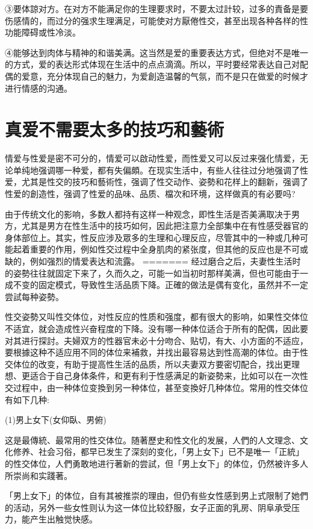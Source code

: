 \documentclass[12pt,UTF8]{ctexbook}
\begin{document}
③要体諒对方。在对方不能满足你的生理要求时，不要太过計较，过多的責备是要伤感情的，而过分的强求生理满足，可能使对方厭倦性交，甚至出现各种各样的性功能障碍或性冷淡。

④能够达到肉体与精神的和谐美满。这当然是爱的重要表达方式，但绝对不是唯一的方式，爱的表达形式体现在生活中的点点滴滴。所以，平时要经常表达自己对配偶的爱意，充分体现自己的魅力，为爱創造温馨的气氛，而不是只在做爱的时候才进行情感的沟通。

\section{真爱不需要太多的技巧和藝術}

情爱与性爱是密不可分的，情爱可以啟动性爱，而性爱又可以反过来强化情爱，无论单纯地强调哪一种爱，都有失偏頗。在现实生活中，有些人往往过分地强调了性爱，尤其是性交的技巧和藝術性，强调了性交动作、姿勢和花样上的翻新，强调了性爱的創造性，强调了性爱的品味、品质、檔次和环境，这样做真的有必要吗?

由于传统文化的影响，多数人都持有这样一种观念，即性生活是否美满取决于男方，尤其是男方在性生活中的技巧如何，因此把注意力全部集中在有性感受器官的身体部位上。其实，性反应涉及眾多的生理和心理反应，尽管其中的一种或几种可能起着重要的作用，例如性交过程中全身肌肉的紧张度，但其他的反应也是不可或缺的，例如强烈的情爱表达和流露。
=======
经过磨合之后，夫妻性生活时的姿勢往往就固定下来了，久而久之，可能一如当初时那样美满，但也可能由于一成不变的固定模式，导致性生活品质下降。正確的做法是偶有变化，虽然并不一定尝試每种姿勢。

性交姿勢又叫性交体位，对性反应的性质和强度，都有很大的影响，如果性交体位不适宜，就会造成性兴奋程度的下降。没有哪一种体位适合于所有的配偶，因此要对其进行探討。夫婦双方的性器官未必十分吻合、贴切，有大、小方面的不适应，要根據这种不适应用不同的体位来補救，并找出最容易达到性高潮的体位。由于性交体位的改变，有助于提高性生活的品质，所以夫妻双方要密切配合，找出更理想、更适合于自己身体条件，和更有利于性感满足的新姿勢来，比如可以在一次性交过程中，由一种体位变換到另一种体位，甚至变換好几种体位。常用的性交体位有如下几种:

(1)男上女下(女仰臥、男俯)

这是最傳統、最常用的性交体位。随著歷史和性文化的发展，人們的人文理念、文化修养、社会习俗，都早已发生了深刻的变化，「男上女下」已不是唯一「正統」的性交体位，人們勇敢地进行著新的尝試，但「男上女下」的体位，仍然被许多人所崇尚和实踐著。

「男上女下」的体位，自有其被推崇的理由，但仍有些女性感到男上式限制了她們的活动，另外一些女性则认为这一体位比较舒服，女子正面的乳房、阴阜承受压力，能产生出触觉快感。
\end{document}
